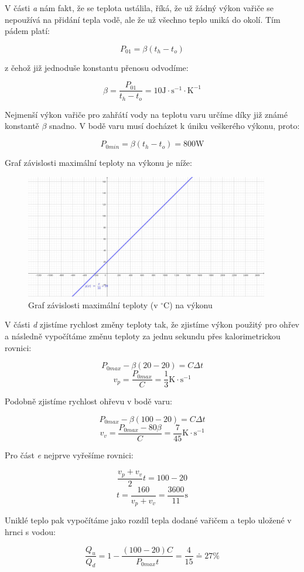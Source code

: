 \documentclass{fkssolpub}
\author{Ondřej Sedláček}
\begin{document}
 

V části \textit{a} nám fakt, že se teplota ustálila, říká, že už žádný
výkon vařiče se nepoužívá na přidání tepla vodě, ale že už všechno teplo
uniká do okolí. Tím pádem platí:

\[
  P_{01} = \beta (t_h - t_o)
\]

z čehož již jednoduše konstantu přenosu odvodíme:

\[
  \beta = \frac{P_{01}}{t_h - t_o} = 10 \text{J} \cdot \text{s}^{-1} \cdot \text{K}^{-1}
\]

Nejmenší výkon vařiče pro zahřátí vody na teplotu varu určíme díky již
známé konstantě $\beta$ snadno. V bodě varu musí docházet k úniku veškerého
výkonu, proto:

\[
  P_{0min} = \beta (t_h - t_o) = 800 \text{W}
\]

Graf závislosti maximální teploty na výkonu je níže:

\begin{figure}[h!]
  \centering
  \includegraphics[width=0.95\textwidth]{5-fig.jpg}
  \caption{Graf závislosti maximální teploty (v $^{\circ}$C) na výkonu}
  \label{fig:1}
\end{figure}

V části \textit{d} zjistíme rychlost změny teploty tak, že zjistíme výkon
použitý pro ohřev a následně vypočítáme změnu teploty za jednu sekundu
přes kalorimetrickou rovnici:

\[
  P_{0max} - \beta (20 - 20) = C \Delta t
\]
\[
  v_p = \frac{P_{0max}}{C} = \frac{1}{3} \text{K} \cdot \text{s}^{-1}
\]

Podobně zjistíme rychlost ohřevu v bodě varu:

\[
  P_{0max} - \beta (100 - 20) = C \Delta t
\]
\[
  v_v = \frac{P_{0max} - 80 \beta}{C} = \frac{7}{45} \text{K} \cdot \text{s}^{-1}
\]

Pro část \textit{e} nejprve vyřešíme rovnici:

\[
  \frac{v_p + v_v}{2} t = 100 - 20
\]
\[
  t = \frac{160}{v_p + v_v} = \frac{3600}{11} \text{s}
\]

Uniklé teplo pak vypočítáme jako rozdíl tepla dodané vařičem a teplo uložené
v hrnci s vodou:

\[
  \frac{Q_u}{Q_d} = 1 - \frac{(100 - 20) C}{P_{0max} t} = \frac{4}{15} \doteq 27 \%
\]
\end{document}
